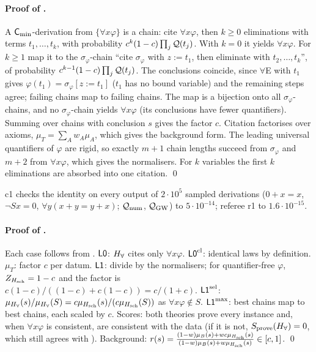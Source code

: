 \paragraph{Proof of .} A $\mathsf{C}_{\min}$-derivation from $\{\forall x\varphi\}$ is a chain: cite $\forall x\varphi$, then $k\ge0$ eliminations with terms $t_1,\dots,t_k$, with probability $c^k(1-c)\prod_j\mathcal{Q}(t_j)$. With $k=0$ it yields $\forall x\varphi$. For $k\ge1$ map it to the $\sigma_\varphi$-chain ``cite $\sigma_\varphi$ with $z:=t_1$, then eliminate with $t_2,\dots,t_k$'', of probability $c^{k-1}(1-c)\prod_j\mathcal{Q}(t_j)$. The conclusions coincide, since $\forall$E with $t_1$ gives $\varphi(t_1)=\sigma_\varphi[z:=t_1]$ ($t_1$ has no bound variable) and the remaining steps agree; failing chains map to failing chains. The map is a bijection onto all $\sigma_\varphi$-chains, and no $\sigma_\varphi$-chain yields $\forall x\varphi$ (its conclusions have fewer quantifiers). Summing over chains with conclusion $s$ gives the factor $c$. Citation factorises over axioms, $\mu_T=\sum_Aw_A\mu_A$, which gives the background form. The leading universal quantifiers of $\varphi$ are rigid, so exactly $m+1$ chain lengths succeed from $\sigma_\varphi$ and $m+2$ from $\forall x\varphi$, which gives the normalisers. For $k$ variables the first $k$ eliminations are absorbed into one citation. \qed

c1 checks the identity on every output of $2\cdot10^5$ sampled derivations ($0+x=x$, $\neg Sx=0$, $\forall y(x+y=y+x)$; $\mathcal{Q}_{\mathrm{num}}$, $\mathcal{Q}_{\mathrm{GW}}$) to $5\cdot10^{-14}$; referee r1 to $1.6\cdot10^{-15}$.

\paragraph{Proof of .} Each case follows from . $\mathord{\mathsf{L0}}$: $H_{\forall}$ cites only $\forall x\varphi$. $\mathord{\mathsf{L0}}^{\mathrm{cl}}$: identical laws by definition. $\mu_T$: factor $c$ per datum. $\mathord{\mathsf{L1}}$: divide by the normalisers; for quantifier-free $\varphi$, $Z_{H_{\mathrm{sch}}}=1-c$ and the factor is $c(1-c)/((1-c)+c(1-c))=c/(1+c)$. $\mathord{\mathsf{L1}}^{\mathrm{sel}}$: $\mu_{H_{\forall}}(s)/\mu_{H_{\forall}}(S)=c\mu_{H_{\mathrm{sch}}}(s)/(c\mu_{H_{\mathrm{sch}}}(S))$ as $\forall x\varphi\notin S$. $\mathord{\mathsf{L1}}^{\max}$: best chains map to best chains, each scaled by $c$. Scores: both theories prove every instance and, when $\forall x\varphi$ is consistent, are consistent with the data (if it is not, $S_{\mathrm{prove}}(H_{\forall})=0$, which still agrees with ). Background: $r(s)=\frac{(1-w)\mu_B(s)+wc\mu_{H_{\mathrm{sch}}}(s)}{(1-w)\mu_B(s)+w\mu_{H_{\mathrm{sch}}}(s)}\in[c,1]$. \qed

